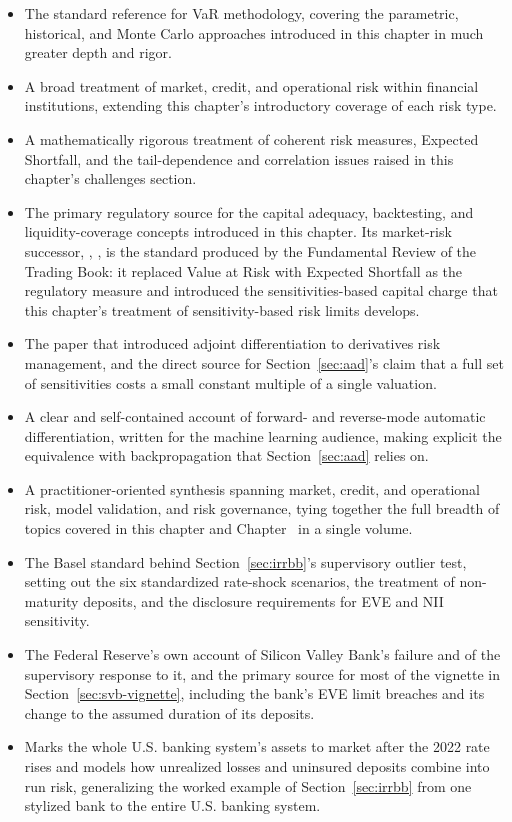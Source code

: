 \documentclass[../ai_in_finance]{subfiles}
\begin{document}
\begin{itemize}
    \item {} The standard reference for VaR methodology, covering the parametric, historical, and Monte Carlo approaches introduced in this chapter in much greater depth and rigor.
    \item {} A broad treatment of market, credit, and operational risk within financial institutions, extending this chapter's introductory coverage of each risk type.
    \item {} A mathematically rigorous treatment of coherent risk measures, Expected Shortfall, and the tail-dependence and correlation issues raised in this chapter's challenges section.
    \item {} The primary regulatory source for the capital adequacy, backtesting, and liquidity-coverage concepts introduced in this chapter. Its market-risk successor, \textcite{bcbs2016minimum}, , is the standard produced by the Fundamental Review of the Trading Book: it replaced Value at Risk with Expected Shortfall as the regulatory measure and introduced the sensitivities-based capital charge that this chapter's treatment of sensitivity-based risk limits develops.
    \item {} The paper that introduced adjoint differentiation to derivatives risk management, and the direct source for Section~\ref{sec:aad}'s claim that a full set of sensitivities costs a small constant multiple of a single valuation.
    \item {} A clear and self-contained account of forward- and reverse-mode automatic differentiation, written for the machine learning audience, making explicit the equivalence with backpropagation that Section~\ref{sec:aad} relies on.
    \item {} A practitioner-oriented synthesis spanning market, credit, and operational risk, model validation, and risk governance, tying together the full breadth of topics covered in this chapter and Chapter~ in a single volume.
    \item {} The Basel standard behind Section~\ref{sec:irrbb}'s supervisory outlier test, setting out the six standardized rate-shock scenarios, the treatment of non-maturity deposits, and the disclosure requirements for EVE and NII sensitivity.
    \item {} The Federal Reserve's own account of Silicon Valley Bank's failure and of the supervisory response to it, and the primary source for most of the vignette in Section~\ref{sec:svb-vignette}, including the bank's EVE limit breaches and its change to the assumed duration of its deposits.
    \item {} Marks the whole U.S. banking system's assets to market after the 2022 rate rises and models how unrealized losses and uninsured deposits combine into run risk, generalizing the worked example of Section~\ref{sec:irrbb} from one stylized bank to the entire U.S. banking system.
\end{itemize}
\end{document}
